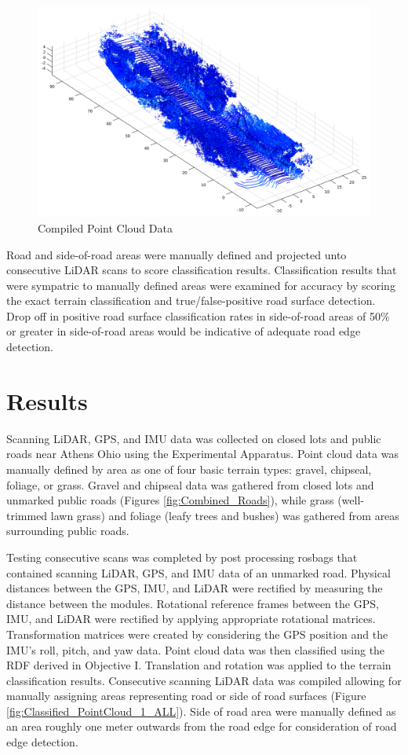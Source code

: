 \documentclass[journal,onecolumn]{IEEEtran}
\begin{document}
	\begin{figure}
		\centering
		\includegraphics[width=0.7\linewidth]{figures/Compiled_PCD}
		\caption[Compiled Point Cloud Data]{Compiled Point Cloud Data}
		\label{fig:Compiled_PCD}
	\end{figure}
	
	{Road and side-of-road areas were manually defined and projected unto consecutive LiDAR scans to score classification results. Classification results that were sympatric to manually defined areas were examined for accuracy by scoring the exact terrain classification and true/false-positive road surface detection. Drop off in positive road surface classification rates in side-of-road areas of 50\% or greater in side-of-road areas would be indicative of adequate road edge detection.}
	

\section{Results}
	
	{Scanning LiDAR, GPS, and IMU data was collected on closed lots and public roads near Athens Ohio using the Experimental Apparatus. Point cloud data was manually defined by area as one of four basic terrain types: gravel, chipseal, foliage, or grass. Gravel and chipseal data was gathered from closed lots and unmarked public roads (Figures \ref{fig:Combined_Roads}), while grass (well-trimmed lawn grass) and foliage (leafy trees and bushes) was gathered from areas surrounding public roads.}

	{Testing consecutive scans was completed by post processing rosbags that contained scanning LiDAR, GPS, and IMU data of an unmarked road. Physical distances between the GPS, IMU, and LiDAR were rectified by measuring the distance between the modules. Rotational reference frames between the GPS, IMU, and LiDAR were rectified by applying appropriate rotational matrices. Transformation matrices were created by considering the GPS position and the IMU's roll, pitch, and yaw data. Point cloud data was then classified using the RDF derived in Objective I. Translation and rotation was applied to the terrain classification results. Consecutive scanning LiDAR data was compiled allowing for manually assigning areas representing road or side of road surfaces (Figure \ref{fig:Classified_PointCloud_1_ALL}). Side of road area were manually defined as an area roughly one meter outwards from the road edge for consideration of road edge detection.}
	
\end{document}
